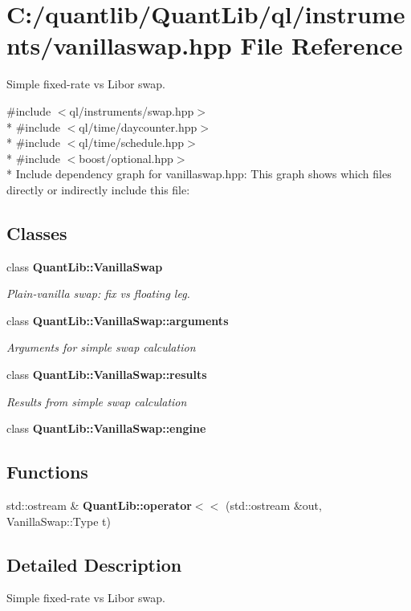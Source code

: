 \section{C\+:/quantlib/\+Quant\+Lib/ql/instruments/vanillaswap.hpp File Reference}
\label{vanillaswap_8hpp}


Simple fixed-\/rate vs Libor swap.  


{\ttfamily \#include $<$ql/instruments/swap.\+hpp$>$}\\*
{\ttfamily \#include $<$ql/time/daycounter.\+hpp$>$}\\*
{\ttfamily \#include $<$ql/time/schedule.\+hpp$>$}\\*
{\ttfamily \#include $<$boost/optional.\+hpp$>$}\\*
Include dependency graph for vanillaswap.\+hpp\+:
This graph shows which files directly or indirectly include this file\+:
\subsection*{Classes}
\begin{DoxyCompactItemize}
\item 
class {\bf Quant\+Lib\+::\+Vanilla\+Swap}
\begin{DoxyCompactList}\small\item\em Plain-\/vanilla swap\+: fix vs floating leg. \end{DoxyCompactList}\item 
class {\bf Quant\+Lib\+::\+Vanilla\+Swap\+::arguments}
\begin{DoxyCompactList}\small\item\em Arguments for simple swap calculation \end{DoxyCompactList}\item 
class {\bf Quant\+Lib\+::\+Vanilla\+Swap\+::results}
\begin{DoxyCompactList}\small\item\em Results from simple swap calculation \end{DoxyCompactList}\item 
class {\bf Quant\+Lib\+::\+Vanilla\+Swap\+::engine}
\end{DoxyCompactItemize}
\subsection*{Functions}
\begin{DoxyCompactItemize}
\item 
std\+::ostream \& {\bfseries Quant\+Lib\+::operator$<$$<$} (std\+::ostream \&out, Vanilla\+Swap\+::\+Type t)\label{vanillaswap_8cpp_a8b89c9964f396b07a660c3248330909d}

\end{DoxyCompactItemize}


\subsection{Detailed Description}
Simple fixed-\/rate vs Libor swap. 

